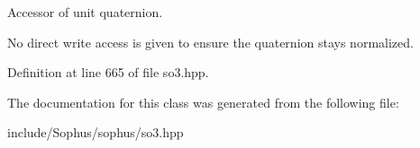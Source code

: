 Accessor of unit quaternion. 

No direct write access is given to ensure the quaternion stays normalized. 

Definition at line 665 of file so3.\+hpp.



The documentation for this class was generated from the following file\+:\begin{DoxyCompactItemize}
\item 
include/\+Sophus/sophus/so3.\+hpp\end{DoxyCompactItemize}
